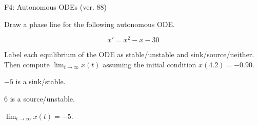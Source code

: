 \begin{exercise}
  \begin{exerciseTitle}F4: Autonomous ODEs (ver. 88)\end{exerciseTitle}
  \begin{exerciseStatement}
    

      Draw a phase line for the following 
      autonomous ODE.
    

    
\[x'= x^{2} - x - 30\]

    

      Label each equilibrium of the ODE
      as stable/unstable and sink/source/neither.
      Then compute \(\lim_{t\to\infty}x(t)\)
      assuming the initial condition
      \(x( 4.2 )= -0.90\).
    

  \end{exerciseStatement}
  \begin{exerciseAnswer}
    

      \(-5\) is a sink/stable.
      
      \(6\) is a source/unstable.
    

    

      \(\lim_{t\to\infty}x(t)=-5\).
    

  \end{exerciseAnswer}
\end{exercise}